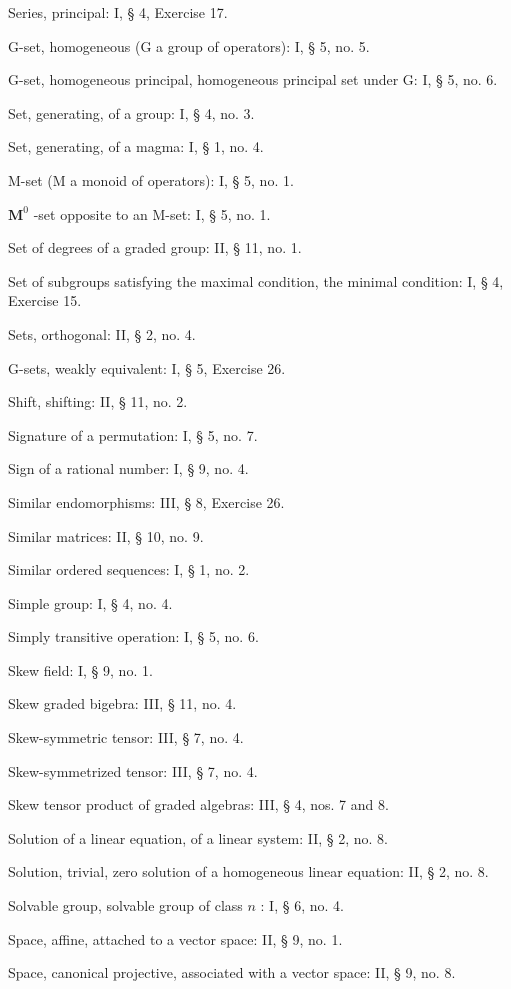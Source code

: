 Series, principal: I, § 4, Exercise 17.

G-set, homogeneous (G a group of operators): I, § 5, no. 5.

G-set, homogeneous principal, homogeneous principal set under G: I, § 5, no. 6.

Set, generating, of a group: I, § 4, no. 3.

Set, generating, of a magma: I, § 1, no. 4.

M-set (M a monoid of operators): I, § 5, no. 1.

\(\mathbf{M}^0\) -set opposite to an M-set: I, § 5, no. 1.

Set of degrees of a graded group: II, § 11, no. 1.

Set of subgroups satisfying the maximal condition, the minimal condition: I, § 4, Exercise 15.

Sets, orthogonal: II, § 2, no. 4.

G-sets, weakly equivalent: I, § 5, Exercise 26.

Shift, shifting: II, § 11, no. 2.

Signature of a permutation: I, § 5, no. 7.

Sign of a rational number: I, § 9, no. 4.

Similar endomorphisms: III, § 8, Exercise 26.

Similar matrices: II, § 10, no. 9.

Similar ordered sequences: I, § 1, no. 2.

Simple group: I, § 4, no. 4.

Simply transitive operation: I, § 5, no. 6.

Skew field: I, § 9, no. 1.

Skew graded bigebra: III, § 11, no. 4.

Skew-symmetric tensor: III, § 7, no. 4.

Skew-symmetrized tensor: III, § 7, no. 4.

Skew tensor product of graded algebras: III, § 4, nos. 7 and 8.

Solution of a linear equation, of a linear system: II, § 2, no. 8.

Solution, trivial, zero solution of a homogeneous linear equation: II, § 2, no. 8.

Solvable group, solvable group of class \(n\) : I, § 6, no. 4.

Space, affine, attached to a vector space: II, § 9, no. 1.

Space, canonical projective, associated with a vector space: II, § 9, no. 8.


